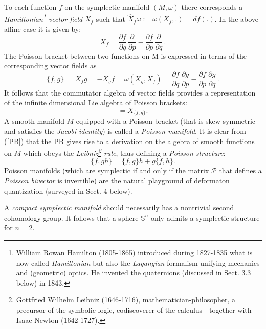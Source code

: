 \documentclass[12pt]{article}
\begin{document}
To each function $f$ on the symplectic manifold $(M, \omega)$
there corresponds a {\it Hamiltonian\footnote{William Rowan Hamilton (1805-1865)
introduced during 1827-1835 what is now called {\it Hamiltonian} but also the
{\it Lagangian} formalism unifying mechanics and (geometric) optics. He invented 
the quaternions (discussed in Sect. 3.3 below) in 1843.} vector field} 
$X_f$ such that $\hat{X}_f\omega := \omega(X_f, .) = df(.)$. In the above affine
 case it is given by:
\begin{equation}
X_f = \frac{\partial f}{\partial q} \, \frac{\partial}{\partial p} -
\frac{\partial f}{\partial p} \, \frac{\partial}{\partial q} \, .
\end{equation}
The Poisson bracket between two functions on M is expressed in terms of the
corresponding vector fields as
\begin{equation}
\label{PB}
\{f , g\}\ = X_f g = -X_g f = \omega(X_g, X_f) = \frac{\partial f}{\partial q} \, \frac{\partial g}{\partial p} - \frac{\partial f}{\partial p} \, \frac{\partial g}{\partial q} \, .
\end{equation}
It follows that the commutator algebra of vector fields provides a representation
of the infinite dimensional Lie algebra of Poisson brackets:
\begin{equation}
 [X_f, X_g] = X_{\{f , g\}}.
\end{equation}
A smooth manifold $M$ equipped with a Poisson bracket (that is skew-symmetric and satisfies the {\it Jacobi identity}) is called
a {\it Poisson manifold}. It is clear from (\ref{PB}) that the PB gives rise to a derivation on the algebra of smooth functions 
on $M$ which obeys the {\it Leibniz\footnote{Gottfried Wilhelm Leibniz (1646-1716), mathematician-philosopher, a precursor of the symbolic logic, codiscoverer of the calculus - together with Isaac Newton (1642-1727).} rule}, thus defining a {\it Poisson structure}:
\begin{equation}
\label{Leib}
\{f, gh\} = \{f, g\} h + g\{f, h\}. 
\end{equation}
Poisson manifolds (which are symplectic if and only if the matrix ${\mathcal P}$ that defines a {\it Poisson bivector} is
invertible) are the natural playground of deformaton quantization (surveyed in Sect. 4 below).
 
A {\it compact symplectic manifold} should necessarily has a nontrivial second cohomology 
group. It follows that a sphere ${\mathbb S}^n$ only admits a symplectic 
structure for $n = 2$. 
\end{document}
